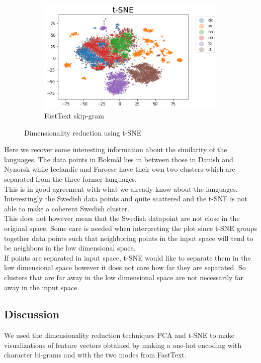 \begin{figure}[h!]
\begin{subfigure}[b]{0.47\textwidth}
        \includegraphics[width=\textwidth]{figs/tsneskipgram1}
        \caption{FastText skip-gram}
    \end{subfigure}
    \caption{Dimensionality reduction using t-SNE}
    \label{tsne}
\end{figure}


Here we recover some interesting information about the similarity of the languages. The data points in Bokmål lies in between those in Danish and Nynorsk while Icelandic and Faroese have their own two clusters which are separated from the three former languages. \\

This is in good agreement with what we already know about the languages. Interestingly the Swedish data points and quite scattered and the t-SNE is not able to make a coherent Swedish cluster.\\

This does not however mean that the Swedish datapoint are not close in the original space. Some care is needed when interpreting the plot since t-SNE groups together data points such that neighboring points in the input space will tend to be neighbors in the low dimensional space.\\

If points are separated in input space, t-SNE would like to separate them in the low dimensional space however it does not care how far they are separated. So clusters that are far away in the low dimensional space are not necessarily far away in the input space.

\subsection{Discussion}
We used the dimensionality reduction techniques PCA and t-SNE to make visualizations of feature vectors obtained by making a one-hot encoding with character bi-grams and with the two modes from FastText.\\

